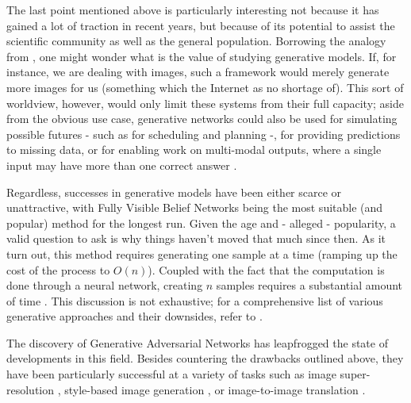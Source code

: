 \documentclass[a4paper]{book}
\begin{document}
The last point mentioned above is particularly interesting not because it has gained a lot of traction in recent years, but because of its potential to assist the scientific community as well as the general population. Borrowing the analogy from \textcite{goodfellow_nips_2016}, one might wonder what is the value of studying generative models. If, for instance, we are dealing with images, such a framework would merely generate more images for us (something which the Internet as no shortage of). This sort of worldview, however, would only limit these systems from their full capacity; aside from the obvious use case, generative networks could also be used for simulating possible futures - such as for scheduling and planning \parencite{finn_deep_2016} -, for providing predictions to missing data, or for enabling work on multi-modal outputs, where a single input may have more than one correct answer \parencite{goodfellow_nips_2016}.

Regardless, successes in generative models have been either scarce or unattractive, with Fully Visible Belief Networks \parencite{frey_does_1996} being the most suitable (and popular) method for the longest run. Given the age and - alleged - popularity, a valid question to ask is why things haven't moved that much since then. As it turn out, this method requires generating one sample at a time (ramping up the cost of the process to $O(n)$). Coupled with the fact that the computation is done through a neural network, creating $n$ samples requires a substantial amount of time \parencite{goodfellow_nips_2016}. This discussion is not exhaustive; for a comprehensive list of various generative approaches and their downsides, refer to \textcite{goodfellow_nips_2016}.

The discovery of Generative Adversarial Networks \parencite[GANs;][]{goodfellow_generative_2014} has leapfrogged the state of developments in this field. Besides countering the drawbacks outlined above, they have been particularly successful at a variety of tasks such as image super-resolution \parencite[; see Figure \ref{fig:srgan}]{ledig_photo-realistic_2016}, style-based image generation \parencite{karras_style-based_2018}, or image-to-image translation \parencite[such as converting a satellite image into a map, or a sketch into a photorealistic image;][;see Figure \ref{fig:pix2pix}]{isola_image--image_2016}.
\end{document}
